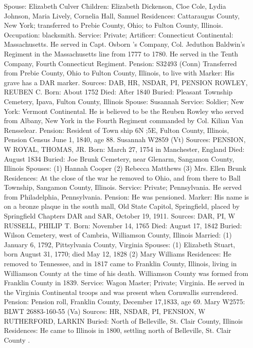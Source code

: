 Spouse: Elizabeth Culver
Children: Elizabeth Dickenson, Cloe Cole, Lydia Johnson, Maria Lively, Cornelia Hall, Samuel
Residences: Cattaraugus County, New York; transferred to Prebie County, Ohio; to Fulton County, Illinois. Occupation: blacksmith.
Service: Private; Artificer: Connecticut Continental: Massachusetts. He served in Capt. Osborn 's Company, Col. Jeduthon Baldwin's Regiment in the Massachusetts line from 1777 to 1780. He served in the Tenth Company, Fourth Connecticut Regiment. 
Pension: S32493 (Conn) Transferred from Prebie County, Ohio to Fulton County, Illinois, to live with
Marker: His grave has a DAR marker.
Sources: DAB, HR, NSDAR, PI, PENSION 
ROWLEY, REUBEN C.
Born: About 1752
Died: After 1840
Buried: Pleasant Township Cemetery, Ipava, Fulton County, Illinois
Spouse: Susannah
Service: Soldier; New York: Vermont Continental. He is believed to be the Reuben Rowley who served from Albany, New York in the Fourth Regiment commanded by Col. Kilian Van Rensselear. 
Pension: Resident of Town ship 6N ;5E, Fulton County, Illinois, Pension Census June 1, 1840, age 88. Susannah W2859 (Vt)
Sources: PENSION, W 
ROYAL, THOMAS, JR.
Born: March 27, 1754 in Manchester, England
Died:  August 1834 
Buried: Joe Brunk Cemetery, near Glenarm, Sangamon County, Illinois 
Spouses:  (1) Hannah Cooper
	  (2) Rebecca Matthews 
	  (3) Mrs. Ellen Brunk
Residences: At the close of the war he removed to Ohio, and from there to Ball Township, Sangamon County, Illinois.
Service: Private; Pennsylvania. He served from Philadelphia, Pennsylvania. 
Pension: He was pensioned.
Marker: His name is on a bronze plaque in the south mall, Old State Capitol, Springfield, placed by Springfield Chapters DAR and SAR, October 19, 1911.
Sources: DAR, PI, W 
RUSSELL, PHILIP T.
Born: November 14, 1765 
Died: August 17, 1842 
Buried: Wilson Cemetery, west of Cambria, Williamson County, Illinois 
Married:  (1) January 6, 1792, Pittsylvania County, Virginia 
Spouses:  (1) Elizabeth Stuart, born August 31, 1770; died May 12, 1828 
	  (2) Mary Williams 
Residences: He removed to Tennessee, and in 1817 came to Franklin County, Illinois, living in Williamson County at the time of his death. Williamson County was formed from Franklin County in 1839. 
Service: Wagon Master; Private; Virginia. He served in the Virginia Continental troops and was present when Cornwallis surrendered. 
Pension: Pension roll, Franklin County, December 17,1833, age 69. Mary W2575: BLWT 26883-160-55 (Va)
Sources: HR, NSDAR, PI, PENSION, W 
RUTHERFORD, LARKIN
Buried: North of Belleville, St. Clair County, Illinois
Residences: He came to Illinois in 1800, settling north of Belleville, St. Clair County .
